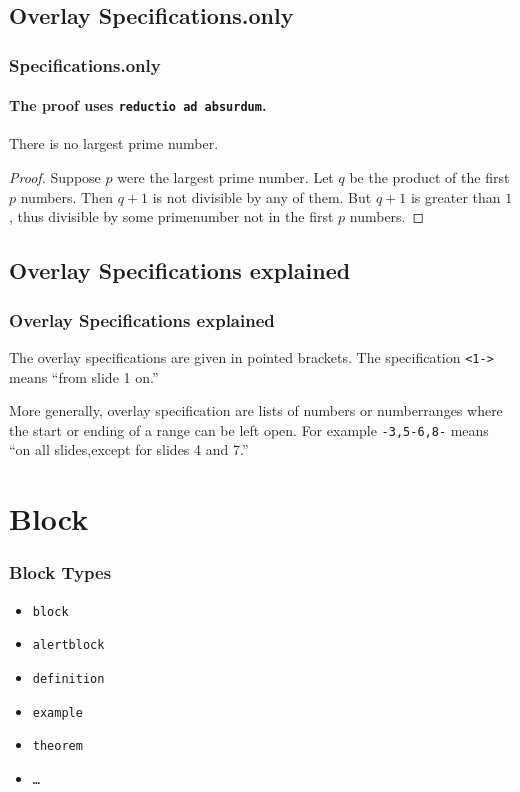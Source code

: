 \documentclass{beamer}
\begin{document}
\subsection{Overlay Specifications.only}
\begin{frame}[t]
  \frametitle{Specifications.only}
  \framesubtitle{The proof uses \texttt{reductio ad absurdum}.}

  \begin{theorem}There is no largest prime number.
  \end{theorem}
  \begin{proof}
     Suppose $p$ were the largest prime number.
     Let $q$ be the product of the first $p$ numbers.
     Then $q + 1$ is not divisible by any of them.
     But $q + 1$ is greater than $1$, thus divisible by some
      primenumber not in the first $p$ numbers.\qedhere
  \end{proof}
\end{frame}

\subsection{Overlay Specifications explained}
\begin{frame}
  \frametitle{Overlay Specifications explained}
  The overlay specifications are given in pointed brackets. The specification
  \texttt{<1->} means ``from slide 1 on.''

  More generally, overlay specification are lists of numbers or numberranges
  where the start or ending of a range can be left open. For example
  \texttt{-3,5-6,8-} means ``on all slides,except for slides 4 and 7.''
\end{frame}

\section{Block}
\begin{frame}
  \frametitle{Block Types}
  \begin{itemize}
  \item \texttt{block}
  \item \texttt{alertblock}
  \item \texttt{definition}
  \item \texttt{example}
  \item \texttt{theorem}
  \item \texttt{\dots}
  \end{itemize}
\end{frame}
\end{document}
